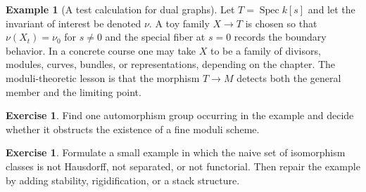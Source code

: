 \documentclass[11pt]{amsart}
\theoremstyle{definition}
\newtheorem{example}[theorem]{Example}
\newtheorem{exercise}[theorem]{Exercise}
\newcommand{\Spec}{\operatorname{Spec}}
\begin{document}
\begin{example}[A test calculation for dual graphs]
Let $T=\Spec k[s]$ and let the invariant of interest be denoted $\nu$.  A toy family $X\to T$ is chosen so that $\nu(X_t)=\nu_0$ for $s\ne0$ and the special fiber at $s=0$ records the boundary behavior.  In a concrete course one may take $X$ to be a family of divisors, modules, curves, bundles, or representations, depending on the chapter.  The moduli-theoretic lesson is that the morphism $T\to M$ detects both the general member and the limiting point.
\end{example}
\begin{exercise}
Find one automorphism group occurring in the example and decide whether it obstructs the existence of a fine moduli scheme.
\end{exercise}
\begin{exercise}
Formulate a small example in which the naive set of isomorphism classes is not Hausdorff, not separated, or not functorial.  Then repair the example by adding stability, rigidification, or a stack structure.
\end{exercise}
\clearpage
\end{document}
